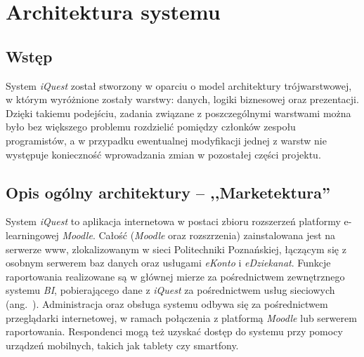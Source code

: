 \chapter{Architektura systemu}
\label{Chapter5}

\section{Wstęp}
\label{Chapter51}

System \textit{iQuest} został stworzony w oparciu o model architektury trójwarstwowej, w którym wyróżnione zostały warstwy: danych, logiki biznesowej oraz prezentacji. Dzięki takiemu podejściu, zadania związane z poszczególnymi warstwami można było bez większego problemu rozdzielić pomiędzy członków zespołu programistów, a w przypadku ewentualnej modyfikacji jednej z warstw nie występuje konieczność wprowadzania zmian w pozostałej części projektu.

\section{Opis ogólny architektury -- ,,Marketektura''}
\label{Chapter52}

System \textit{iQuest} to aplikacja internetowa w postaci zbioru rozszerzeń platformy e-learningowej \textit{Moodle}. Całość (\textit{Moodle} oraz rozszrzenia) zainstalowana jest na serwerze www, zlokalizowanym w sieci Politechniki Poznańskiej, łączącym się z osobnym serwerem baz danych oraz usługami \textit{eKonto} i \textit{eDziekanat}. Funkcje raportowania realizowane są w głównej mierze za pośrednictwem zewnętrznego systemu \textit{BI}, pobierającego dane z \textit{iQuest} za pośrednictwem usług sieciowych (ang.~). Administracja oraz obsługa systemu odbywa się za pośrednictwem przeglądarki internetowej, w ramach połączenia z platformą \textit{Moodle} lub serwerem raportowania. Respondenci mogą też uzyskać dostęp do systemu przy pomocy urządzeń mobilnych, takich jak tablety czy smartfony.

